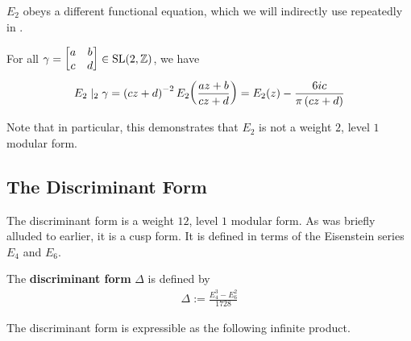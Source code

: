 
$E_2$ obeys a different functional equation, which we will indirectly use repeatedly in .

\begin{boxlemma}\label{Ch2:Lemma:E2_slash_action}
    For all $\gamma = \begin{bmatrix} a & b \\ c & d \end{bmatrix} \in \operatorname{SL}\!\left( 2, \mathbb{Z} \right)$, we have
    \begin{align*}
        E_2 \mid_2 \gamma = \left( cz + d \right)^{-2} E_2\!\left( \frac{az + b}{cz + d} \right) = E_2(z) - \frac{6ic}{\pi\left( cz + d \right)}
    \end{align*}
\end{boxlemma}

Note that in particular, this demonstrates that $E_2$ is not a weight $2$, level $1$ modular form.

\subsection{The Discriminant Form}

The discriminant form is a weight $12$, level $1$ modular form. As was briefly alluded to earlier, it is a cusp form. It is defined in terms of the Eisenstein series $E_4$ and $E_6$.

\begin{boxdefinition}\label{Ch2:Def:DiscForm}
    The \textbf{discriminant form} $\Delta$ is defined by
    \begin{align}
        \Delta := \frac{E_4^3 - E_6^2}{1728}
        \label{Ch2:Eq:DiscForm_def}
    \end{align}
\end{boxdefinition}

The discriminant form is expressible as the following infinite product.

